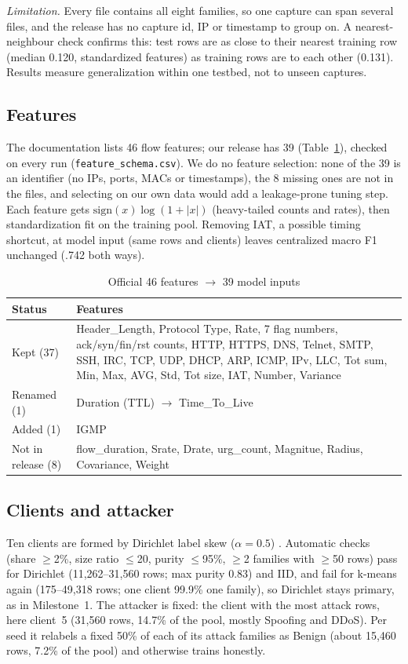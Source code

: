 \documentclass[journal]{IEEEtran}
\begin{document}
\emph{Limitation.} Every file contains all eight families, so one capture can span several files, and the release has no capture id, IP or timestamp to group on. A nearest-neighbour check confirms this: test rows are as close to their nearest training row (median 0.120, standardized features) as training rows are to each other (0.131). Results measure generalization within one testbed, not to unseen captures.



\subsection{Features}
The documentation lists 46 flow features; our release has 39 (Table~\ref{tab:features}), checked on every run (\texttt{feature\_schema.csv}). We do no feature selection: none of the 39 is an identifier (no IPs, ports, MACs or timestamps), the 8 missing ones are not in the files, and selecting on our own data would add a leakage-prone tuning step. Each feature gets $\mathrm{sign}(x)\log(1+|x|)$ (heavy-tailed counts and rates), then standardization fit on the training pool. Removing IAT, a possible timing shortcut, at model input (same rows and clients) leaves centralized macro F1 unchanged (.742 both ways).

\begin{table}[t]
\caption{Official 46 features $\rightarrow$ 39 model inputs}
\label{tab:features}
\centering\footnotesize
\begin{tabular}{@{}p{}p{}@{}}
\toprule
Status & Features \\
\midrule
Kept (37) & Header\_Length, Protocol Type, Rate, 7 flag numbers, ack/syn/fin/rst counts, HTTP, HTTPS, DNS, Telnet, SMTP, SSH, IRC, TCP, UDP, DHCP, ARP, ICMP, IPv, LLC, Tot sum, Min, Max, AVG, Std, Tot size, IAT, Number, Variance \\
Renamed (1) & Duration (TTL) $\rightarrow$ Time\_To\_Live \\
Added (1) & IGMP \\
Not in release (8) & flow\_duration, Srate, Drate, urg\_count, Magnitue, Radius, Covariance, Weight \\
\bottomrule
\end{tabular}
\end{table}

\subsection{Clients and attacker}
Ten clients are formed by Dirichlet label skew ($\alpha=0.5$) \cite{hsu2019}. Automatic checks (share $\geq$2\%, size ratio $\leq$20, purity $\leq$95\%, $\geq$2 families with $\geq$50 rows) pass for Dirichlet (11,262--31,560 rows; max purity 0.83) and IID, and fail for k-means again (175--49,318 rows; one client 99.9\% one family), so Dirichlet stays primary, as in Milestone~1. The attacker is fixed: the client with the most attack rows, here client~5 (31,560 rows, 14.7\% of the pool, mostly Spoofing and DDoS). Per seed it relabels a fixed 50\% of each of its attack families as Benign (about 15,460 rows, 7.2\% of the pool) and otherwise trains honestly.
\end{document}
